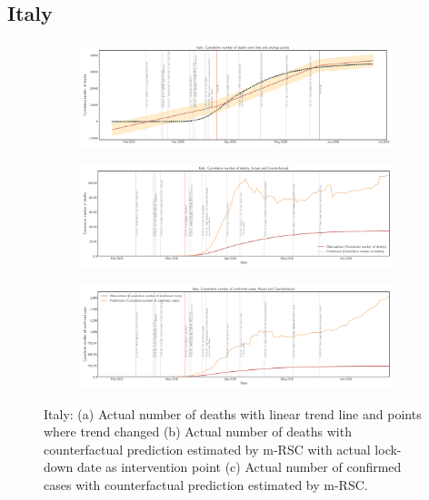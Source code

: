 \documentclass[preprint,authoryear,12pt]{elsarticle}
\begin{document}
	
	\subsection{Italy}
	
		\begin{figure}
		\centering
		\begin{subfigure}[b]{\textwidth}
			\centering
			\includegraphics[width=0.9\linewidth,height=0.2\textheight]{Italy_deaths_trend}
		\end{subfigure}
		
		\begin{subfigure}[b]{\textwidth}
			\centering
			\includegraphics[width=0.9\linewidth,height=0.2\textheight]{Italy_deaths}
		\end{subfigure}
		
		\begin{subfigure}[b]{\textwidth}
			\centering
			\includegraphics[width=0.9\linewidth,height=0.2\textheight]{Italy_confirmed cases}
		\end{subfigure}
		
		\caption[Italy]{Italy: (a) Actual number of deaths with linear trend line and points where trend changed (b) Actual number of deaths with counterfactual prediction estimated by m-RSC with actual lock-down date as intervention point (c) Actual number of confirmed cases with counterfactual prediction estimated by m-RSC.}
		\label{fig6} 
	\end{figure}
\end{document}
